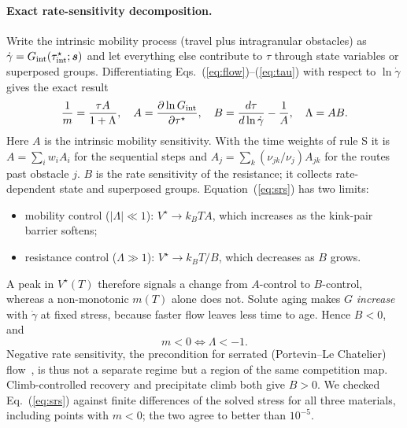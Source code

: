 \documentclass[aps,prl,twocolumn,superscriptaddress,amsmath,amssymb,floatfix]{revtex4-2}
\newcommand{\gd}{\dot\gamma}
\newcommand{\ts}{\tau^{\star}}
\newcommand{\kT}{k_BT}
\begin{document}
\paragraph{Exact rate-sensitivity decomposition.}
Write the intrinsic mobility process (travel plus intragranular obstacles) as $\gd=G_{\rm int}(\tau^\star_{\rm int};\bm s)$ and let everything else contribute to $\tau$ through state variables or superposed groups. Differentiating Eqs.~(\ref{eq:flow})--(\ref{eq:tau}) with respect to $\ln\gd$ gives the exact result
\begin{equation}
\frac1m=\frac{\tau A}{1+\Lambda},\quad
A=\frac{\partial\ln G_{\rm int}}{\partial\ts},\quad
B=\frac{d\tau}{d\ln\gd}-\frac1A,\quad
\Lambda=AB.
\label{eq:srs}
\end{equation}
Here $A$ is the intrinsic mobility sensitivity. With the time weights of rule S it is $A=\sum_iw_iA_i$ for the sequential steps and $A_j=\sum_k(\nu_{jk}/\nu_j)A_{jk}$ for the routes past obstacle $j$. $B$ is the rate sensitivity of the resistance; it collects rate-dependent state and superposed groups. Equation~(\ref{eq:srs}) has two limits:
\begin{itemize}
  \item mobility control ($|\Lambda|\ll1$): $V^\star\to\kT A$, which increases as the kink-pair barrier softens;
  \item resistance control ($\Lambda\gg1$): $V^\star\to\kT/B$, which decreases as $B$ grows.
\end{itemize}
A peak in $V^\star(T)$ therefore signals a change from $A$-control to $B$-control, whereas a non-monotonic $m(T)$ alone does not. Solute aging makes $G$ \emph{increase} with $\gd$ at fixed stress, because faster flow leaves less time to age. Hence $B<0$, and
\begin{equation}
m<0\iff\Lambda<-1 .
\end{equation}
Negative rate sensitivity, the precondition for serrated (Portevin--Le Chatelier) flow~\cite{McCormick1988}, is thus not a separate regime but a region of the same competition map. Climb-controlled recovery and precipitate climb both give $B>0$. We checked Eq.~(\ref{eq:srs}) against finite differences of the solved stress for all three materials, including points with $m<0$; the two agree to better than $10^{-5}$.

\end{document}

